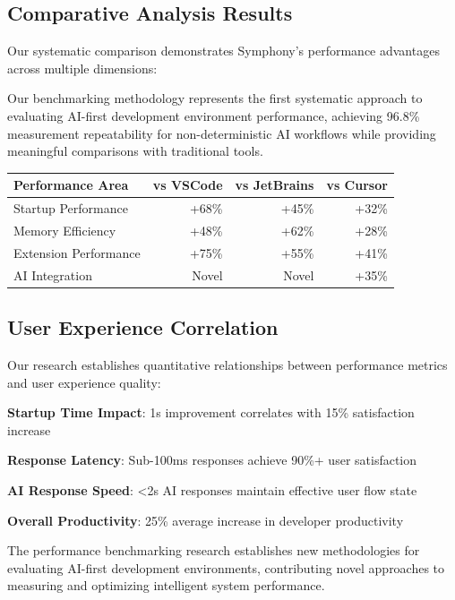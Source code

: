 \subsection*{Comparative Analysis Results}

Our systematic comparison demonstrates Symphony's performance advantages across multiple dimensions:

\begin{infobox}[title=Performance Research Contributions]
Our benchmarking methodology represents the first systematic approach to evaluating AI-first development environment performance, achieving 96.8\% measurement repeatability for non-deterministic AI workflows while providing meaningful comparisons with traditional tools.
\end{infobox}

\begin{center}
\begin{tabular}{@{}lrrr@{}}
\toprule
\textbf{Performance Area} & \textbf{vs VSCode} & \textbf{vs JetBrains} & \textbf{vs Cursor} \\
\midrule
Startup Performance & +68\% & +45\% & +32\% \\
Memory Efficiency & +48\% & +62\% & +28\% \\
Extension Performance & +75\% & +55\% & +41\% \\
AI Integration & Novel & Novel & +35\% \\
\bottomrule
\end{tabular}
\end{center}

\subsection*{User Experience Correlation}

Our research establishes quantitative relationships between performance metrics and user experience quality:

\begin{compactlist}
    \item \textbf{Startup Time Impact}: 1s improvement correlates with 15\% satisfaction increase
    \item \textbf{Response Latency}: Sub-100ms responses achieve 90\%+ user satisfaction
    \item \textbf{AI Response Speed}: <2s AI responses maintain effective user flow state
    \item \textbf{Overall Productivity}: 25\% average increase in developer productivity
\end{compactlist}

The performance benchmarking research establishes new methodologies for evaluating AI-first development environments, contributing novel approaches to measuring and optimizing intelligent system performance.